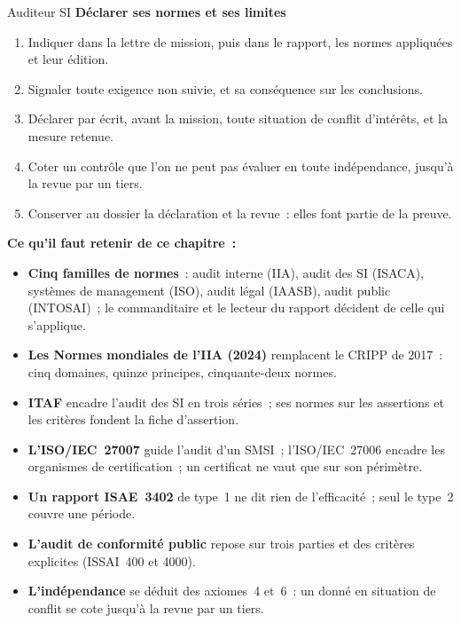 \begin{boxmetier}{Auditeur SI}
\textbf{Déclarer ses normes et ses limites}
\begin{enumerate}
    \item Indiquer dans la lettre de mission, puis dans le rapport, les
          normes appliquées et leur édition.
    \item Signaler toute exigence non suivie, et sa conséquence sur les
          conclusions.
    \item Déclarer par écrit, avant la mission, toute situation de conflit
          d'intérêts, et la mesure retenue.
    \item Coter \NEK{} un contrôle que l'on ne peut pas évaluer en toute
          indépendance, jusqu'à la revue par un tiers.
    \item Conserver au dossier la déclaration et la revue~: elles font
          partie de la preuve.
\end{enumerate}
\end{boxmetier}


\separateur

\begin{boxresume}
\textbf{Ce qu'il faut retenir de ce chapitre~:}
\begin{itemize}
    \item \textbf{Cinq familles de normes}~: audit interne (IIA), audit des
          SI (ISACA), systèmes de management (ISO), audit légal (IAASB),
          audit public (INTOSAI)~; le commanditaire et le lecteur du
          rapport décident de celle qui s'applique.
    \item \textbf{Les Normes mondiales de l'IIA (2024)} remplacent le CRIPP
          de 2017~: cinq domaines, quinze principes, cinquante-deux normes.
    \item \textbf{ITAF} encadre l'audit des SI en trois séries~; ses normes
          sur les assertions et les critères fondent la fiche d'assertion.
    \item \textbf{L'ISO/IEC~27007} guide l'audit d'un SMSI~; l'ISO/IEC~27006
          encadre les organismes de certification~; un certificat ne vaut
          que sur son périmètre.
    \item \textbf{Un rapport ISAE~3402} de type~1 ne dit rien de
          l'efficacité~; seul le type~2 couvre une période.
    \item \textbf{L'audit de conformité public} repose sur trois parties et
          des critères explicites (ISSAI~400 et 4000).
    \item \textbf{L'indépendance} se déduit des axiomes~4 et~6~: un \OUI{}
          donné en situation de conflit se cote \NEK{} jusqu'à la revue par
          un tiers.
\end{itemize}
\end{boxresume}

